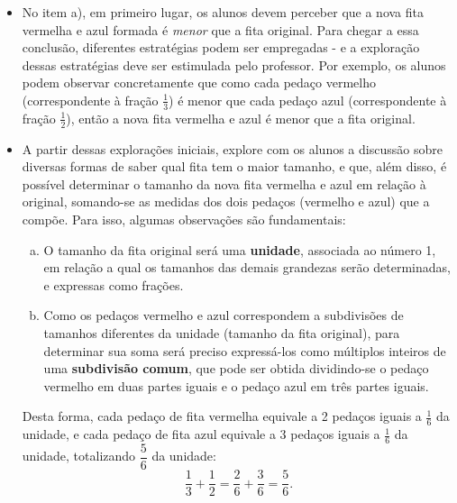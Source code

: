 \begin{multicols}{2}
\begin{itemize}
   \item  No item a), em primeiro lugar, os alunos devem perceber que a nova fita vermelha e azul formada é {\it menor} que a fita original. Para chegar a essa conclusão, diferentes estratégias podem ser empregadas - e a exploração dessas estratégias deve ser estimulada pelo professor. Por exemplo, os alunos podem observar concretamente que como cada pedaço vermelho (correspondente à fração $\frac{1}{3}$) é menor que cada pedaço azul (correspondente à fração $\frac{1}{2}$), então a nova fita vermelha e azul é menor que a fita original.
  \item  A partir dessas explorações iniciais, explore com os alunos a discussão sobre diversas formas de saber qual fita tem o maior tamanho, e que, além disso, é possível determinar o tamanho da nova fita vermelha e azul em relação à original, somando-se as medidas dos dois pedaços (vermelho e azul) que a compõe. Para isso, algumas observações são fundamentais:
  \begin{enumerate}[a)]
    \item O tamanho da fita original será uma {\bf unidade}, associada ao número 1, em relação a qual os tamanhos das demais grandezas serão determinadas, e expressas como frações.
    \item Como os pedaços vermelho e azul correspondem a subdivisões de tamanhos diferentes da unidade (tamanho da fita original), para determinar sua soma será preciso expressá-los como múltiplos inteiros de uma {\bf subdivisão comum}, que pode ser obtida dividindo-se o pedaço vermelho em duas partes iguais e o pedaço azul em três partes iguais.
 \end{enumerate}

 
\begin{center}
\end{center}


Desta forma, cada pedaço de fita vermelha equivale a 2 pedaços iguais a $\frac{1}{6}$ da unidade, e cada pedaço de fita azul equivale a 3 pedaços iguais a $\frac{1}{6}$ da unidade, totalizando $\dfrac{5}{6}$ da unidade:
$$\dfrac{1}{3} + \dfrac{1}{2} = \dfrac{2}{6} + \dfrac{3}{6} = \dfrac{5}{6}.$$


\end{itemize}
\end{multicols}
